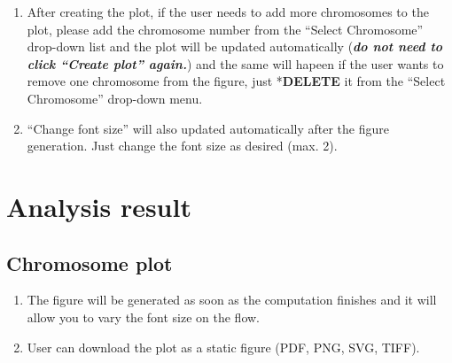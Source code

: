 \documentclass[
  a4paper,
  oneside,
  open=any]{scrreport}
\providecommand{\tightlist}{%
  \setlength{\itemsep}{0pt}\setlength{\parskip}{0pt}}\usepackage{longtable,booktabs,array}
\begin{document}
\begin{tcolorbox}[enhanced jigsaw, bottomrule=.15mm, left=2mm, coltitle=black, breakable, colback=white, arc=.35mm, rightrule=.15mm, opacitybacktitle=0.6, toptitle=1mm, leftrule=.75mm, toprule=.15mm, bottomtitle=1mm, opacityback=0, colbacktitle=quarto-callout-tip-color!10!white, titlerule=0mm, colframe=quarto-callout-tip-color-frame, title=\textcolor{quarto-callout-tip-color}{\faLightbulb}\hspace{0.5em}{Tip}]

\begin{enumerate}
\def\labelenumi{\arabic{enumi}.}
\tightlist
\item
  After creating the plot, if the user needs to add more chromosomes to
  the plot, please add the chromosome number from the ``Select
  Chromosome'' drop-down list and the plot will be updated automatically
  (\textbf{\emph{do not need to click ``Create plot'' again.}}) and the
  same will hapeen if the user wants to remove one chromosome from the
  figure, just *\textbf{DELETE} it from the ``Select Chromosome''
  drop-down menu.
\item
  ``Change font size'' will also updated automatically after the figure
  generation. Just change the font size as desired (max. 2).
\end{enumerate}

\end{tcolorbox}

\hypertarget{analysis-result-3}{%
\section{Analysis result}\label{analysis-result-3}}

\hypertarget{chromosome-plot}{%
\subsection{Chromosome plot}\label{chromosome-plot}}

\begin{enumerate}
\def\labelenumi{\arabic{enumi}.}
\tightlist
\item
  The figure will be generated as soon as the computation finishes and
  it will allow you to vary the font size on the flow.
\item
  User can download the plot as a static figure (PDF, PNG, SVG, TIFF).\\
\end{enumerate}
\end{document}
